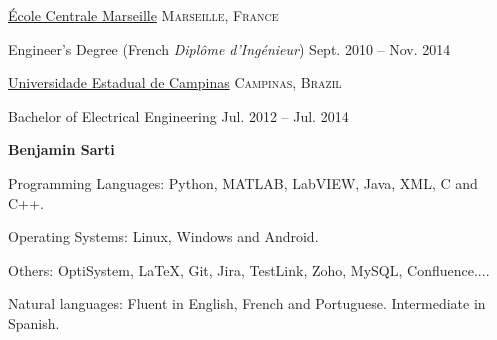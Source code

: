 \documentclass[12pt,a4paper]{article} %
\begin{document}
\headedsection %
{\href{https://www.centrale-marseille.fr/}{École Centrale Marseille}}
{\textsc{Marseille, France}} {

\headedsubsection %
{Engineer's Degree (French \textit{Diplôme d'Ingénieur})}
{Sept. 2010 -- Nov. 2014}
{}
}


\headedsection %
{\href{http://www.fee.unicamp.br/cg}{Universidade Estadual de Campinas}}
{\textsc{Campinas, Brazil}} {

\headedsubsection %
{Bachelor of Electrical Engineering}
{Jul. 2012 -- Jul. 2014} 

{}
}
\newpage

\begin{Large}
\textbf{Benjamin Sarti}
\end{Large}

\spacedhrule{0.5em}{-0.4em} %



\inlineheadsection %
{Programming Languages:}
{Python, MATLAB, LabVIEW, Java, XML, C and C++.}

\inlineheadsection
{Operating Systems:} 
{Linux, Windows and Android.}

\inlineheadsection
{Others:} 
{OptiSystem, \LaTeX, Git, Jira, TestLink, Zoho, MySQL, Confluence....}

\vspace{0.18cm}
\inlineheadsection %
{Natural languages:}
{Fluent in English, French and Portuguese. Intermediate in Spanish.}
\end{document}

